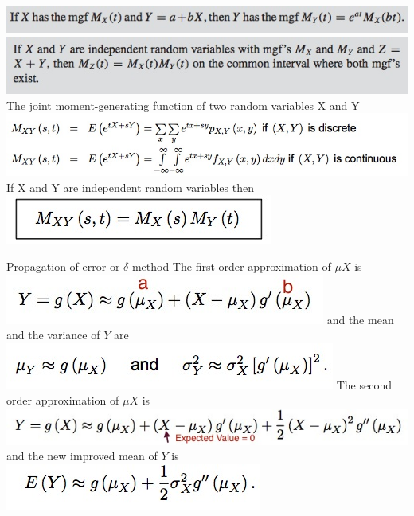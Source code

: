 \documentclass{/out/app/latex/examnotes}
\begin{document}
{
\includegraphics[scale=0.5]{./img/456.jpg}
\vspace{6pt}
\includegraphics[scale=0.5]{./img/457.jpg}
\vspace{6pt}
\ra The joint moment-generating function of two random variables X and Y 
\includegraphics[scale=0.5]{./img/458.jpg}
\ra If X and Y are independent random variables then
\includegraphics[scale=0.5]{./img/459.jpg}

\ra Propagation of error or $\delta$ method
\vspace{6pt}
\ra The first order approximation of $\mu X$ is
\includegraphics[scale=0.5]{./img/461.jpg}
\ra and the mean and the variance of $Y$ are
\includegraphics[scale=0.5]{./img/462.jpg}
\ra The second order approximation of $\mu X$ is
\includegraphics[scale=0.5]{./img/463.jpg}
\ra and the new improved mean of $Y$ is
\includegraphics[scale=0.5]{./img/464.jpg}

}
\end{document}
